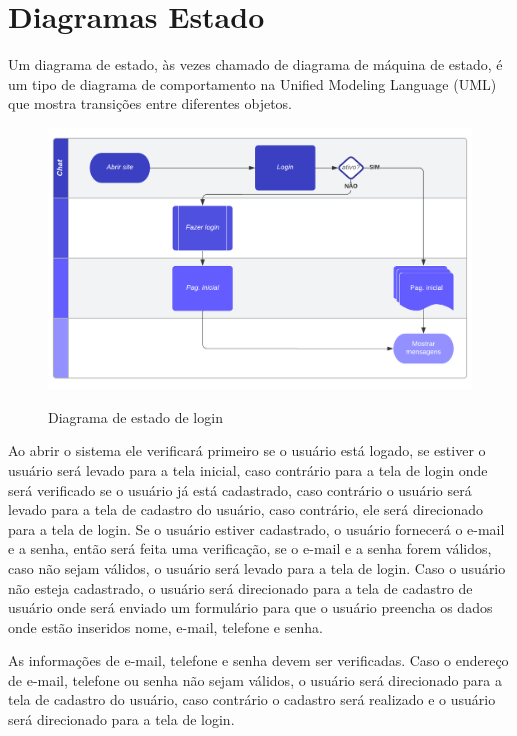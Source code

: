 \section{Diagramas Estado}
Um diagrama de estado, às vezes chamado de diagrama de máquina de estado, é um tipo de diagrama de comportamento na Unified Modeling Language (UML) que mostra transições entre diferentes objetos.
\begin{figure}[H]
  \begin{center}
        \caption{Diagrama de estado de login} \label{afp}
        \includegraphics[width=15cm]{Pictures/diagram/estado.png} \\


  \end{center}
\end{figure}
Ao abrir o sistema ele verificará primeiro se o usuário está logado, se estiver o usuário será levado para a tela inicial, caso contrário para a tela de login onde será verificado se o usuário já está cadastrado, caso contrário o usuário será levado para a tela de cadastro do usuário, caso contrário, ele será direcionado para a tela de login. Se o usuário estiver cadastrado, o usuário fornecerá o e-mail e a senha, então será feita uma verificação, se o e-mail e a senha forem válidos, caso não sejam válidos, o usuário será levado para a tela de login. Caso o usuário não esteja cadastrado, o usuário será direcionado para a tela de cadastro de usuário onde será enviado um formulário para que o usuário preencha os dados onde estão inseridos nome, e-mail, telefone e senha.

As informações de e-mail, telefone e senha devem ser verificadas. Caso o endereço de e-mail, telefone ou senha não sejam válidos, o usuário será direcionado para a tela de cadastro do usuário, caso contrário o cadastro será realizado e o usuário será direcionado para a tela de login.
